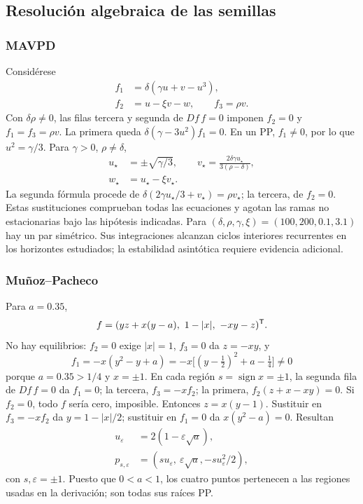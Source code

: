 \subsection{Resolución algebraica de las semillas}

\subsubsection{MAVPD}
Considérese
\begin{equation}
 \begin{aligned}
 f_1&=\delta(\gamma u+v-u^3),\\
 f_2&=u-\xi v-w,\qquad f_3=\rho v.
 \end{aligned}
 \label{bre:geo:mavpd}
\end{equation}
Con $\delta\rho\ne0$, las filas tercera y segunda de $Df\,f=0$
imponen $f_2=0$ y $f_1=f_3=\rho v$. La primera queda
$\delta(\gamma-3u^2)f_1=0$. En un PP, $f_1\ne0$, por lo que
$u^2=\gamma/3$. Para $\gamma>0$, $\rho\ne\delta$,
\begin{equation}
 \begin{aligned}
 u_\star&=\pm\sqrt{\gamma/3},\qquad
 v_\star=\frac{2\delta\gamma u_\star}{3(\rho-\delta)},\\
 w_\star&=u_\star-\xi v_\star.
 \end{aligned}
 \label{bre:geo:mavpd-roots}
\end{equation}
La segunda fórmula procede de
$\delta(2\gamma u_\star/3+v_\star)=\rho v_\star$; la tercera, de
$f_2=0$. Estas sustituciones comprueban todas las ecuaciones y agotan las
ramas no estacionarias bajo las hipótesis indicadas. Para
$(\delta,\rho,\gamma,\xi)=(100,200,0.1,3.1)$ hay un par simétrico.
Sus integraciones alcanzan ciclos interiores recurrentes en los horizontes
estudiados; la estabilidad asintótica requiere evidencia adicional.

\subsubsection{Muñoz--Pacheco}
Para $a=0.35$,
\begin{equation}
 f=(yz+x(y-a),\ 1-|x|,\ -xy-z)^{\mathsf T}.
 \label{bre:geo:munoz}
\end{equation}
No hay equilibrios: $f_2=0$ exige $|x|=1$, $f_3=0$ da $z=-xy$, y
\[
 f_1=-x(y^2-y+a)
 =-x\bigl[(y-\tfrac12)^2+a-\tfrac14\bigr]\ne0
\]
porque $a=0.35>1/4$ y $x=\pm1$.
En cada región $s=\operatorname{sign}x=\pm1$, la
segunda fila de $Df\,f=0$ da $f_1=0$; la tercera, $f_3=-xf_2$; la
primera, $f_2(z+x-xy)=0$. Si $f_2=0$, todo $f$ sería cero, imposible.
Entonces $z=x(y-1)$. Sustituir en $f_3=-xf_2$ da
$y=1-|x|/2$; sustituir en $f_1=0$ da $x(y^2-a)=0$. Resultan
\begin{equation}
 \begin{aligned}
 u_\varepsilon&=2(1-\varepsilon\sqrt a),\\
 p_{s,\varepsilon}&=(su_\varepsilon,\ \varepsilon\sqrt a,
                   -su_\varepsilon^2/2),
 \end{aligned}
 \label{bre:geo:munoz-roots}
\end{equation}
con $s,\varepsilon=\pm1$. Puesto que $0<a<1$, los cuatro puntos
pertenecen a las regiones usadas en la derivación; son todas sus raíces PP.


